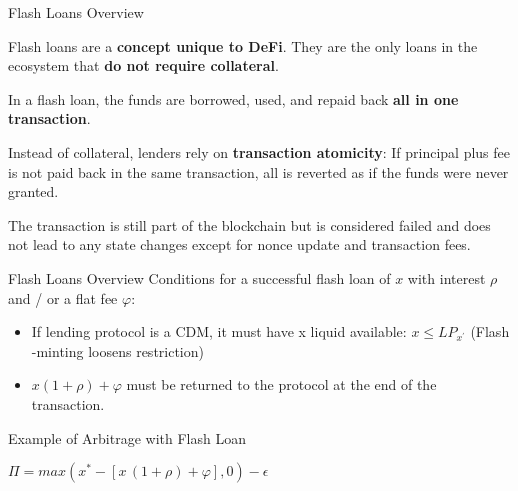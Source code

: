 \documentclass[handout]{beamer}
\begin{document}
\begin{frame}{Flash Loans Overview}

Flash loans are a \textbf{concept unique to DeFi}. They are the only loans in the ecosystem that \textbf{do not require collateral}.

\vspace{1em}

In a flash loan, the funds are borrowed, used, and repaid back \textbf{all in one transaction}.

\vspace{1em}

Instead of collateral, lenders rely on \textbf{transaction atomicity}: If principal plus fee is not paid back in the same transaction, all is reverted as if the funds were never granted.

\vspace{1em}

The transaction is still part of the blockchain but is considered failed and does not lead to any state changes except for nonce update and transaction fees. 



	
\end{frame}


\begin{frame}{Flash Loans Overview}
Conditions for a successful flash loan of $x$ with interest $\rho$  and / or a flat fee $\varphi$:

\vspace{1em}
\begin{itemize}
\item If lending protocol is a CDM, it must have x liquid available:  $x \leq LP_{x^{'}}$ (Flash -minting loosens restriction)


\item  $ x(1+\rho) + \varphi$ must be returned to the protocol at the end of the transaction.


\end{itemize}

	
\end{frame}


\begin{frame}{Example of Arbitrage with Flash Loan}

\begin{figure}[t]
	\centering
	\begin{tikzpicture}[scale=1.0, every node/.style={scale=1.0}]
		
	\end{tikzpicture}
\end{figure}


$\Pi = max (x^{*}-[x \,(1+\rho) + \varphi ],0) - \epsilon$
	
\end{frame}
\end{document}
